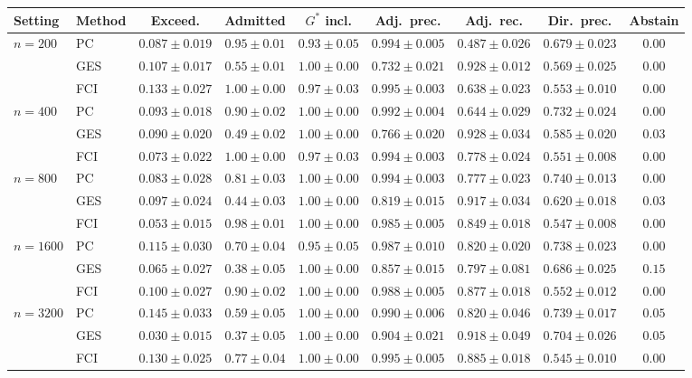 \begin{tabular}{llccccccc}
\toprule
Setting & Method & Exceed. & Admitted & $G^\ast$ incl. & Adj.\ prec. & Adj.\ rec. & Dir.\ prec. & Abstain \\
\midrule
$n{=}200$ & PC & $0.087\pm0.019$ & $0.95\pm0.01$ & $0.93\pm0.05$ & $0.994\pm0.005$ & $0.487\pm0.026$ & $0.679\pm0.023$ & $0.00$ \\
 & GES & $0.107\pm0.017$ & $0.55\pm0.01$ & $1.00\pm0.00$ & $0.732\pm0.021$ & $0.928\pm0.012$ & $0.569\pm0.025$ & $0.00$ \\
 & FCI & $0.133\pm0.027$ & $1.00\pm0.00$ & $0.97\pm0.03$ & $0.995\pm0.003$ & $0.638\pm0.023$ & $0.553\pm0.010$ & $0.00$ \\
$n{=}400$ & PC & $0.093\pm0.018$ & $0.90\pm0.02$ & $1.00\pm0.00$ & $0.992\pm0.004$ & $0.644\pm0.029$ & $0.732\pm0.024$ & $0.00$ \\
 & GES & $0.090\pm0.020$ & $0.49\pm0.02$ & $1.00\pm0.00$ & $0.766\pm0.020$ & $0.928\pm0.034$ & $0.585\pm0.020$ & $0.03$ \\
 & FCI & $0.073\pm0.022$ & $1.00\pm0.00$ & $0.97\pm0.03$ & $0.994\pm0.003$ & $0.778\pm0.024$ & $0.551\pm0.008$ & $0.00$ \\
$n{=}800$ & PC & $0.083\pm0.028$ & $0.81\pm0.03$ & $1.00\pm0.00$ & $0.994\pm0.003$ & $0.777\pm0.023$ & $0.740\pm0.013$ & $0.00$ \\
 & GES & $0.097\pm0.024$ & $0.44\pm0.03$ & $1.00\pm0.00$ & $0.819\pm0.015$ & $0.917\pm0.034$ & $0.620\pm0.018$ & $0.03$ \\
 & FCI & $0.053\pm0.015$ & $0.98\pm0.01$ & $1.00\pm0.00$ & $0.985\pm0.005$ & $0.849\pm0.018$ & $0.547\pm0.008$ & $0.00$ \\
$n{=}1600$ & PC & $0.115\pm0.030$ & $0.70\pm0.04$ & $0.95\pm0.05$ & $0.987\pm0.010$ & $0.820\pm0.020$ & $0.738\pm0.023$ & $0.00$ \\
 & GES & $0.065\pm0.027$ & $0.38\pm0.05$ & $1.00\pm0.00$ & $0.857\pm0.015$ & $0.797\pm0.081$ & $0.686\pm0.025$ & $0.15$ \\
 & FCI & $0.100\pm0.027$ & $0.90\pm0.02$ & $1.00\pm0.00$ & $0.988\pm0.005$ & $0.877\pm0.018$ & $0.552\pm0.012$ & $0.00$ \\
$n{=}3200$ & PC & $0.145\pm0.033$ & $0.59\pm0.05$ & $1.00\pm0.00$ & $0.990\pm0.006$ & $0.820\pm0.046$ & $0.739\pm0.017$ & $0.05$ \\
 & GES & $0.030\pm0.015$ & $0.37\pm0.05$ & $1.00\pm0.00$ & $0.904\pm0.021$ & $0.918\pm0.049$ & $0.704\pm0.026$ & $0.05$ \\
 & FCI & $0.130\pm0.025$ & $0.77\pm0.04$ & $1.00\pm0.00$ & $0.995\pm0.005$ & $0.885\pm0.018$ & $0.545\pm0.010$ & $0.00$ \\

\end{tabular}
